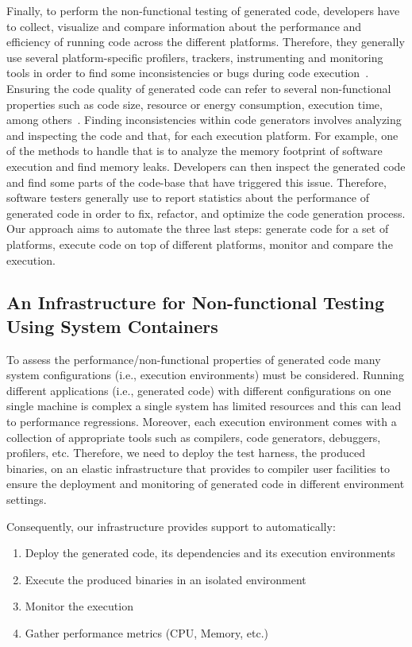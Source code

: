 Finally, to perform the non-functional testing of generated code, developers have to collect, visualize and compare information about the performance and efficiency of running code across the different platforms. 
Therefore, they generally use several platform-specific profilers, trackers, instrumenting and monitoring tools in order to find some inconsistencies or bugs during code execution~\cite{guana2014chaintracker,delgado2004taxonomy}. Ensuring the code quality of generated code can refer to several non-functional properties such as code size, resource or energy consumption, execution time, among others~\cite{pan2006fast}. Finding inconsistencies within code generators involves analyzing and inspecting the code and that, for each execution platform. For example, one of the methods to handle that is to analyze the memory footprint of software execution and find memory leaks. Developers can then inspect the generated code and find some parts of the code-base that have triggered this issue. %
Therefore, software testers generally use to report statistics about the performance of generated code in order to fix, refactor, and optimize the code generation process. Our approach aims to automate the three last steps: generate code for a set of platforms, execute code on top of different platforms, monitor and compare the execution. 

\subsection{An Infrastructure for Non-functional Testing Using System Containers}
To assess the performance/non-functional properties of generated code many system configurations (i.e., execution environments) must be considered. Running different applications (i.e., generated code) with different configurations on one single machine is complex  a single system has limited resources and this can lead to performance regressions. Moreover, each execution environment comes with a collection of appropriate tools such as compilers, code generators, debuggers, profilers, etc. Therefore, we need to deploy the test harness, \ie the produced binaries, on an elastic infrastructure that provides to compiler user facilities to ensure the deployment and monitoring of generated code in different environment settings. 

Consequently, our infrastructure provides support to automatically:
\begin{enumerate}
	\item Deploy the generated code, its dependencies and its  execution environments
	\item Execute the produced binaries in an isolated environment 
	\item Monitor the execution 
	\item Gather performance metrics (CPU, Memory, etc.)
\end{enumerate}

